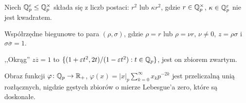 Niech $\mathbb Q_p^\varepsilon \le \mathbb Q_p^\times$ składa się z liczb postaci: $r^2$ lub $\kappa r^2$, gdzie $r \in \mathbb Q_p^\times$, $\kappa \in \mathbb Q_p^\varepsilon$ nie jest kwadratem.

\begin{definicja}
	Współrzędne biegunowe to para $(\rho, \sigma)$, gdzie $\rho = r$ lub $\rho = \nu r$, $\nu \neq 0$, $z = \rho \sigma$ i $\sigma \overline \sigma = 1$.
\end{definicja}

,,Okrąg'' $z \overline z = 1$ to $\{(1 + \varepsilon t^2, 2t) / (1 - \varepsilon t^2) : t \in \mathbb Q_p\}$, jest on zbiorem zwartym.

\begin{fakt}
	Obraz funkcji $\varphi \colon \mathbb Q_p \to \mathbb R_+$, $\varphi(x) = |x|_p \sum_{k = 0}^\infty x_k p^{-2k}$ jest przeliczalną unią rozłącznych, nigdzie gęstych zbiorów o mierze Lebesgue'a zero, które są doskonałe.
\end{fakt}